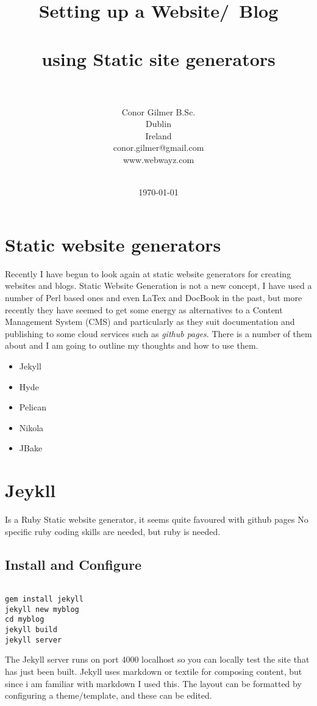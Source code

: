 \documentclass[12pt]{article}			%
\title{Setting up a Website/\ Blog\\~\\ using Static site generators\\~\\}	%
\author{	Conor Gilmer B.Sc.\\	%
		Dublin \\
		Ireland \\
		conor.gilmer@gmail.com\\
		www.webwayz.com\\~\\
		}
\date{\today}				%
\begin{document}
\maketitle
\newpage
\tableofcontents
\newpage

\section{Static website generators}
Recently I have begun to look again at static website generators for creating websites and blogs. Static Website Generation is not a new concept, I have used a number of Perl based ones and even LaTex and DocBook in the past, but more recently they have seemed to get some energy as alternatives to a Content Management System (CMS) and particularly as they suit documentation and publishing to some cloud services such as \textit{github pages}. There is a number of them about and I am going to outline my thoughts and how to use them.
\begin{itemize}
\item Jekyll
\item Hyde
\item Pelican
\item Nikola
\item JBake
\end{itemize}


\newpage
\section{Jeykll}
Is a Ruby Static website generator, it seems quite favoured with github pages
No specific ruby coding skills are needed, but ruby is needed.
\subsection{Install and Configure}

\begin{verbatim}

gem install jekyll
jekyll new myblog
cd myblog
jekyll build
jekyll server

\end{verbatim}
The Jekyll server runs on port 4000 localhost so you can locally test the site that has just been built.
Jekyll uses markdown or textile for composing content, but since i am familiar with markdown I used this. The layout can be formatted by configuring a theme/template, and these can be edited.
\end{document}
